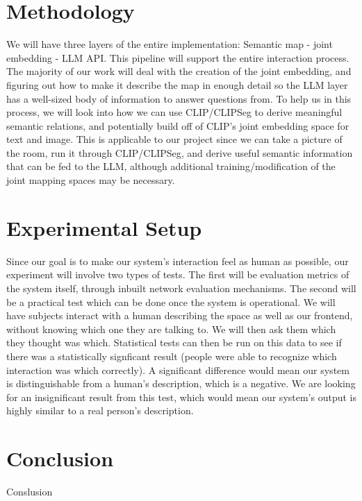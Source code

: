 \documentclass[letterpaper, 10 pt, conference]{ieeeconf}  %
\begin{document}
\section{Methodology}
    We will have three layers of the entire implementation: Semantic map - joint embedding - LLM API. This pipeline will support the entire interaction process. The majority of our work will deal with the creation of the joint embedding, and figuring out how to make it describe the map in enough detail so the LLM layer has a well-sized body of information to answer questions from. To help us in this process, we will look into how we can use CLIP/CLIPSeg to derive meaningful semantic relations, and potentially build off of CLIP's joint embedding space for text and image. This is applicable to our project since we can take a picture of the room, run it through CLIP/CLIPSeg, and derive useful semantic information that can be fed to the LLM, although additional training/modification of the joint mapping spaces may be necessary.


\section{Experimental Setup}
    Since our goal is to make our system's interaction feel as human as possible, our experiment will involve two types of tests. The first will be evaluation metrics of the system itself, through inbuilt network evaluation mechanisms. The second will be a practical test which can be done once the system is operational. We will have subjects interact with a human describing the space as well as our frontend, without knowing which one they are talking to. We will then ask them which they thought was which. Statistical tests can then be run on this data to see if there was a statistically signficant result (people were able to recognize which interaction was which correctly). A significant difference would mean our system is distinguishable from a human's description, which is a negative. We are looking for an insignificant result from this test, which would mean our system's output is highly similar to a real person's description. 


\section{Conclusion}
Conslusion

%
%
\end{document}
